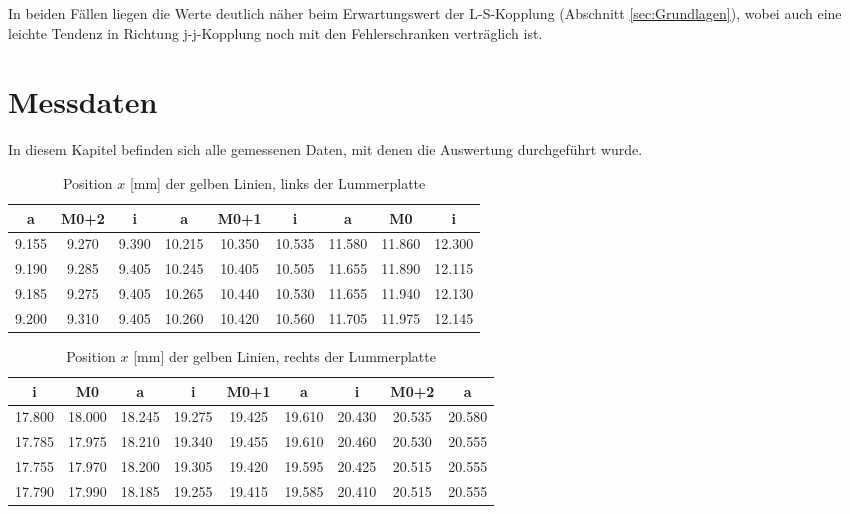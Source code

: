 \documentclass[a4paper,parskip,11pt, DIV12]{scrreprt}
\begin{document}
	In beiden Fällen liegen die Werte deutlich näher beim Erwartungswert der L-S-Kopplung (Abschnitt \ref{sec:Grundlagen}), wobei auch eine leichte Tendenz in Richtung j-j-Kopplung noch mit den Fehlerschranken verträglich ist.
	
	
	
		
	\chapter{Messdaten}
	In diesem Kapitel befinden sich alle gemessenen Daten, mit denen die Auswertung durchgeführt wurde.
	
	\begin{table}[H]
	\begin{tabular}{|c|c|c||c|c|c||c|c|c|}
	\hline 
a	&	M0+2	&	i	&	a	&	M0+1	&	i	&	a	&	M0	&	i	\\
	\hline
	\hline
9.155	&	9.270	&	9.390	&	10.215	&	10.350	&	10.535	&	11.580	&	11.860	&	12.300	\\
	\hline
9.190	&	9.285	&	9.405	&	10.245	&	10.405	&	10.505	&	11.655	&	11.890	&	12.115	\\
	\hline
9.185	&	9.275	&	9.405	&	10.265	&	10.440	&	10.530	&	11.655	&	11.940	&	12.130	\\
	\hline
9.200	&	9.310	&	9.405	&	10.260	&	10.420	&	10.560	&	11.705	&	11.975	&	12.145	\\
	\hline
	\end{tabular}
	\caption{Position $x$ [mm] der gelben Linien, links der Lummerplatte}
	\end{table}
	
	\begin{table}[H]	
	\begin{tabular}{|c|c|c||c|c|c||c|c|c|}
	\hline 
i	&	M0	&	a	&	i	&	M0+1	&	a	&	i	&	M0+2	&	a	\\
	\hline
	\hline
17.800	&	18.000	&	18.245	&	19.275	&	19.425	&	19.610	&	20.430	&	20.535	&	20.580	\\
	\hline
17.785	&	17.975	&	18.210	&	19.340	&	19.455	&	19.610	&	20.460	&	20.530	&	20.555	\\
	\hline
17.755	&	17.970	&	18.200	&	19.305	&	19.420	&	19.595	&	20.425	&	20.515	&	20.555	\\
	\hline
17.790	&	17.990	&	18.185	&	19.255	&	19.415	&	19.585	&	20.410	&	20.515	&	20.555	\\
	\hline
	\end{tabular} 
	\caption{Position $x$ [mm] der gelben Linien, rechts der Lummerplatte}
	\end{table}
	
\end{document}
